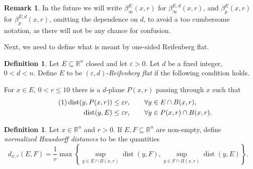\documentclass[11pt, twoside, leqno]{article}
\numberwithin{equation}{section}
\newcommand\numberthis{\addtocounter{equation}{1}\tag{\theequation}}
\theoremstyle{plain}
\theoremstyle{definition}
\newtheorem{rk}[thm]{Remark}
\newtheorem{defin}[thm]{Definition}
\newcommand{\R}{\mathbb{R}}
\newcommand{\e}{\varepsilon} %
\newcommand{\dist}{\operatorname{dist}}
\begin{document}
\begin{rk}
In the future we will write $\beta_{\infty}^E(x,r)$ for $\beta_{\infty}^{E,d}(x,r)$, and $\beta_p^E(x,r)$ for $\beta_p^{E,d}(x,r)$, omitting the dependence on $d$, to avoid a too cumbersome notation, as there will not be any chance for confusion.
\end{rk}

Next, we need to define what is meant by one-sided Reifenberg flat.


\begin{defin} \label{reifen}
Let $E \subseteq \R^n$ closed and let $\e >0$. Let $d$ be a fixed integer, $0 < d < n$. Define $E$ to be $(\e,d)$-\emph{Reifenberg flat} if the following condition holds. 

For $x \in E$, $0 < r \leq 10$ there is a $d$-plane $P(x,r)$ passing through $x$ such that 
\begin{align*} \numberthis
\dist(y, P(x,r)) & \leq \e r, \qquad \forall y \in E \cap B(x,r), \\
\dist(y, E) & \leq \e r, \qquad \forall y \in P(x,r) \cap B(x,r).
\end{align*}
\end{defin}

\begin{defin}
Let $x \in \R^n$ and $r>0$. If $E,F \subseteq \R^n$ are non-empty, define \emph{normalized Hausdorff distances} to be the quantities
\begin{equation}
d_{x,r}(E,F) = \frac{1}{r} \max \left\{ \sup_{y \in E \cap B(x,r)} \dist(y,F), \sup_{y \in F \cap B(x,r)} \dist(y,E)\right\}.
\end{equation}
\end{defin}
\end{document}
